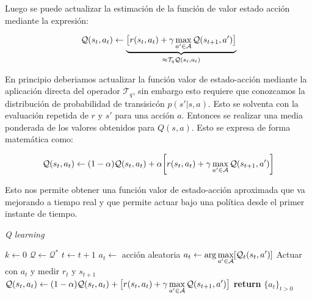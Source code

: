Luego se puede actualizar la estimación de la función de valor estado acción mediante la expresión:

\begin{gather}
    \displaystyle \mathcal{Q}(s_t,a_t) \gets    \underbrace{\big[ r(s_t,a_t) + \gamma \max_{a'\in \mathcal{A}}\mathcal{Q}(s_{t+1},a') \big]}_{\approx\mathcal{T}_q \mathcal{Q}(s_t,a_t)}
\end{gather}

En principio deberiamos actualizar la función valor de estado-acción mediante la aplicación directa del operador $\mathcal{T}_q$, sin embargo esto requiere que conozcamos la distribución de probabilidad de transisicón $p(s'|s,a)$. Esto se solventa con la evaluación repetida de $r$ y $s'$ para una acción $a$. Entonces se realizar una media ponderada de los valores obtenidos para $Q(s,a)$. Esto se expresa de forma matemática como:

\begin{gather}
    \displaystyle \mathcal{Q}(s_t,a_t) \gets  (1-\alpha)\mathcal{Q}(s_t,a_t)  + \alpha \bigg[ r(s_t,a_t) + \gamma \max_{a'\in \mathcal{A}}\mathcal{Q}(s_{t+1},a') \bigg]
\end{gather}

Esto nos permite obtener una función valor de estado-acción aproximada que va mejorando a tiempo real y que permite actuar bajo una política desde el primer instante de tiempo.
\begin{algorithm}[!ht]
    \caption{\emph{Q learning}}\label{Qlearning}
    \begin{algorithmic}[1]
        \State $k \gets 0$
        \State $\mathcal{Q} \gets \mathcal{Q}^{*}$
            \State $t \gets t + 1$
                \State $a_t \leftarrow$ acción aleatoria
            \Else
                \State $\displaystyle a_t \leftarrow \arg \max_{a'\in \mathcal{A}} [\mathcal{Q}_t(s_t,a') ]$
            \EndIf
            \State Actuar con $a_t$ y medir $r_{t}$ y $s_{t+1}$
            \State $\displaystyle \mathcal{Q}(s_t,a_t) \gets (1-\alpha)\mathcal{Q}(s_t,a_t) +  
            \big[ r(s_t,a_t) + \gamma \max_{a'\in \mathcal{A}}\mathcal{Q}(s_{t+1},a') \big]$
        \EndWhile
        \State \textbf{return} $\{a_t\}_{t>0}$
        \EndProcedure
    \end{algorithmic}
\end{algorithm}



